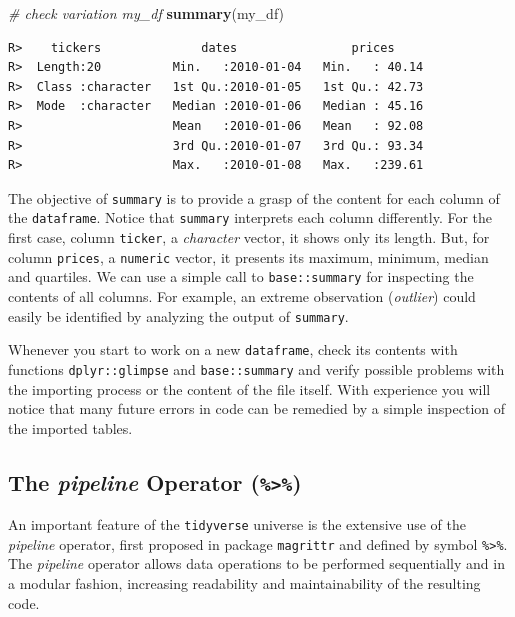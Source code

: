 \documentclass[
  12pt,
]{book}
\newenvironment{Shaded}{\begin{snugshade}}{\end{snugshade}}
\newcommand{\CommentTok}[1]{\textcolor[rgb]{0.37,0.37,0.37}{\textit{#1}}}
\newcommand{\KeywordTok}[1]{\textcolor[rgb]{0.27,0.27,0.27}{\textbf{#1}}}
\newcommand{\NormalTok}[1]{#1}
\newenvironment{rmdimportant}
{\begin{importantblock}
		
	} {\end{importantblock}}
\begin{document}
\begin{Shaded}
\begin{Highlighting}[]
\CommentTok{# check variation my_df}
\KeywordTok{summary}\NormalTok{(my_df)}
\end{Highlighting}
\end{Shaded}

\begin{verbatim}
R>    tickers              dates                prices      
R>  Length:20          Min.   :2010-01-04   Min.   : 40.14  
R>  Class :character   1st Qu.:2010-01-05   1st Qu.: 42.73  
R>  Mode  :character   Median :2010-01-06   Median : 45.16  
R>                     Mean   :2010-01-06   Mean   : 92.08  
R>                     3rd Qu.:2010-01-07   3rd Qu.: 93.34  
R>                     Max.   :2010-01-08   Max.   :239.61
\end{verbatim}

The objective of \texttt{summary} is to provide a grasp of the content for each column of the \texttt{dataframe}. Notice that \texttt{summary} interprets each column differently. For the first case, column \texttt{ticker}, a \emph{character} vector, it shows only its length. But, for column \texttt{prices}, a \texttt{numeric} vector, it presents its maximum, minimum, median and quartiles. We can use a simple call to \texttt{base::summary} for inspecting the contents of all columns. For example, an extreme observation (\emph{outlier}) could easily be identified by analyzing the output of \texttt{summary}.

\begin{rmdimportant}
Whenever you start to work on a new \texttt{dataframe}, check its
contents with functions \texttt{dplyr::glimpse} and
\texttt{base::summary} and verify possible problems with the importing
process or the content of the file itself. With experience you will
notice that many future errors in code can be remedied by a simple
inspection of the imported tables.
\end{rmdimportant}

\hypertarget{the-pipeline-operator}{%
\subsection{\texorpdfstring{The \emph{pipeline} Operator (\texttt{\%\textgreater{}\%})}{The pipeline Operator (\%\textgreater\%)}}\label{the-pipeline-operator}}

An important feature of the \texttt{tidyverse} universe is the extensive use of the \emph{pipeline} operator, first proposed in package \texttt{magrittr} \citep{R-magrittr} and defined by symbol \texttt{\%\textgreater{}\%}. The \emph{pipeline} operator allows data operations to be performed sequentially and in a modular fashion, increasing readability and maintainability of the resulting code.
\end{document}

